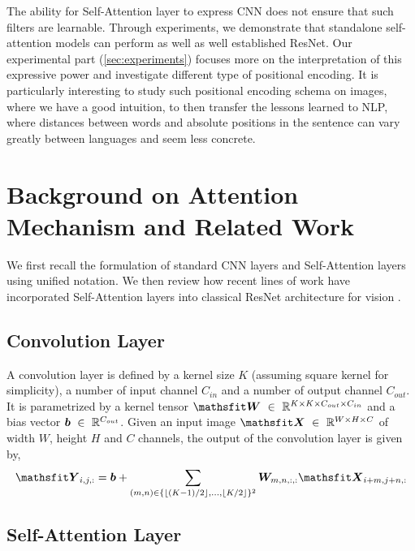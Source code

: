 \documentclass{article} %
\begin{document}
The ability for Self-Attention layer to express CNN does not ensure that such filters are learnable.
%
Through experiments, we demonstrate that standalone self-attention models can perform as well as well established ResNet.
%
Our experimental part (\cref{sec:experiments}) focuses more on the interpretation of this expressive power and investigate different type of positional encoding.
%
It is particularly interesting to study such positional encoding schema on images, where we have a good intuition, to then transfer the lessons learned to NLP, where distances between words and absolute positions in the sentence can vary greatly between languages and seem less concrete.
%

\section{Background on Attention Mechanism and Related Work}
\label{sec:background}

We first recall the formulation of standard CNN layers and Self-Attention layers using unified notation.
We then review how recent lines of work have incorporated Self-Attention layers into classical ResNet architecture for vision \citep{ramachandran2019standaloneselfattention,belloAttentionAugmentedConvolutional2019}.


\subsection{Convolution Layer}

A convolution layer is defined by a kernel size $K$ (assuming square kernel for simplicity), a number of input channel $C_{in}$ and a number of output channel $C_{out}$. 
It is parametrized by a kernel tensor $\tW~\in~\R^{K\times K \times C_{out} \times C_{in}}$ and a bias vector ${\bm{b}}~\in~\mathbb{R}^{C_{out}}$.
Given an input image $\tX~\in~\R^{W\times H \times C}$ of width $W$, height $H$ and $C$ channels, 
the output of the convolution layer is given by,
%
\begin{align}
  \tY_{i,j,:} = 
  \vb 
  +
  \sum_{(m, n) \in \{\lfloor (K-1) / 2 \rfloor, \dots, \lfloor K / 2 \rfloor\}^2}
  \mW_{m,n,:,:}
  \tX_{i+m, j+n, :}
\end{align}
%


\subsection{Self-Attention Layer}
\end{document}
